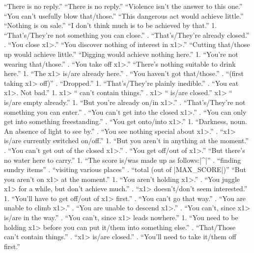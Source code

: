   ``There is no reply.''
   ``There is no reply.''
  ``Violence isn't the answer to this one.''
   ``You can't usefully blow that/those.''
   ``This dangerous act would achieve little.''
   ``Nothing is on sale.''
  ``I don't think much is to be achieved by that.''
  1. ``That's/They're not something you can close.''
. ``That's/They're already closed.''
. ``You close \<x1>.''
 ``You discover nothing of interest in \<x1>.''
   ``Cutting that/those up would achieve little.''
   ``Digging would achieve nothing here.''
 1. ``You're not wearing that/those.''
. ``You take off \<x1>.''
  ``There's nothing suitable to drink here.''
   1. ``The \<x1> is/are already here.''
. ``You haven't got that/those.''
. ``(first taking \<x1> off)''
. ``Dropped.''
   1. ``That's/They're plainly inedible.''
. ``You eat \<x1>. Not bad.''
  1. \<x1> `` can't contain things.''
. \<x1> `` is/are closed.''
\N   \<x1> `` is/are empty already.''
  1. ``But you're already on/in \<x1>.''
. ``That's/They're not something you can enter.''
. ``You can't get into the closed \<x1>.''
. ``You can only get into something freestanding.''
. ``You get onto/into \<x1>.''
 1. ``Darkness, noun. An absence of light to see by.''
. ``You see nothing special about \<x1>.''
. ``\<x1> is/are currently switched on/off.''
   1. ``But you aren't in anything at the moment.''
. ``You can't get out of the closed \<x1>.''
. ``You get off/out of \<x1>.''
   ``But there's no water here to carry.''
 1. ``The score is/was made up as follows:|^|''
. ``finding sundry items''
. ``visiting various places''
. ``total (out of |MAX_SCORE|)''
  ``But you aren't on \<x1> at the moment.''
   1. ``You aren't holding \<x1>.''
. ``You juggle \<x1> for a while, but don't achieve much.''
. ``\<x1> doesn't/don't seem interested.''
  1. ``You'll have to get off/out of \<x1> first.''
. ``You can't go that way.''
. ``You are unable to climb \<x1>.''
. ``You are unable to descend \<x1>.''
. ``You can't, since \<x1> is/are in the way.''
. ``You can't, since \<x1> leads nowhere.''
  1. ``You need to be holding \<x1> before you
can put it/them into something else.''
. ``That/Those can't contain things.''
. ``\<x1> is/are closed.''
. ``You'll need to take it/them off first.''
